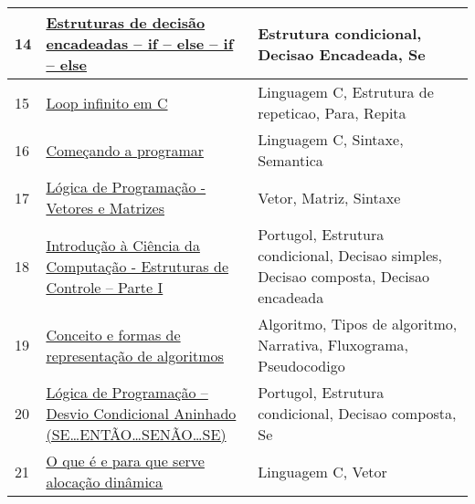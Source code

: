 \begin{longtable}{| p{} | p{} | p{} |}
14  & \href{http://linguagemc.com.br/estruturas-de-decisao-encadeadas-if-else-if-else/}{Estruturas de decisão encadeadas – if – else – if – else                            } & Estrutura condicional, Decisao Encadeada, Se                                                                                                      \\ \hline
15  & \href{http://linguagemc.com.br/loop-infinito-em-c/}{Loop infinito em C                                                                  } & Linguagem C, Estrutura de repeticao, Para, Repita                                                                                                 \\ \hline
16  & \href{http://marmsx.msxall.com/cursos/c3.html}{Começando a programar                                                               } & Linguagem C, Sintaxe, Semantica                                                                                                                   \\ \hline
17  & \href{http://nerdsti.com.br/?p=259}{Lógica de Programação - Vetores e Matrizes                                          } & Vetor, Matriz, Sintaxe                                                                                                                            \\ \hline
18  & \href{http://wiki.icmc.usp.br/images/5/57/Estruturas\_Controle\_I\_SCC0120\_v2.pdf}{Introdução à Ciência da Computação - Estruturas de Controle – Parte I               } & Portugol, Estrutura condicional, Decisao simples, Decisao composta, Decisao encadeada                                                             \\ \hline
19  & \href{http://www.berriel.com.br/ltpi/aula01/aula01.htm}{Conceito e formas de representação de algoritmos                                    } & Algoritmo, Tipos de algoritmo, Narrativa, Fluxograma, Pseudocodigo                                                                                \\ \hline
20  & \href{http://www.bosontreinamentos.com.br/logica-de-programacao/12-logica-de-programacao-desvio-condicional-aninhado-se-entao-senao-se/}{Lógica de Programação – Desvio Condicional Aninhado (SE…ENTÃO…SENÃO…SE)             } & Portugol, Estrutura condicional, Decisao composta, Se                                                                                             \\ \hline
21  & \href{http://www.cprogressivo.net/2013/03/O-que-e-alocacao-dinamica-de-memoria-em-Linguagem-C.html}{O que é e para que serve alocação dinâmica                                          } & Linguagem C, Vetor                                                                                                                                \\ \hline

\end{longtable}
